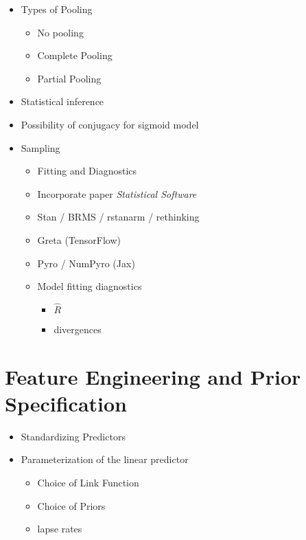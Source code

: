\documentclass[
]{article}
\providecommand{\tightlist}{%
  \setlength{\itemsep}{0pt}\setlength{\parskip}{0pt}}
\begin{document}
\begin{itemize}
\tightlist
\item
  Types of Pooling

  \begin{itemize}
  \tightlist
  \item
    No pooling
  \item
    Complete Pooling
  \item
    Partial Pooling
  \end{itemize}
\item
  Statistical inference
\item
  Possibility of conjugacy for sigmoid model
\item
  Sampling

  \begin{itemize}
  \tightlist
  \item
    Fitting and Diagnostics
  \item
    Incorporate paper \emph{Statistical Software}
  \item
    Stan / BRMS / rstanarm / rethinking
  \item
    Greta (TensorFlow)
  \item
    Pyro / NumPyro (Jax)
  \item
    Model fitting diagnostics

    \begin{itemize}
    \tightlist
    \item
      \(\hat{R}\)
    \item
      divergences
    \end{itemize}
  \end{itemize}
\end{itemize}

\hypertarget{feature-engineering}{%
\section{Feature Engineering and Prior Specification}\label{feature-engineering}}

\begin{itemize}
\tightlist
\item
  Standardizing Predictors
\item
  Parameterization of the linear predictor

  \begin{itemize}
  \tightlist
  \item
    Choice of Link Function
  \item
    Choice of Priors
  \item
    lapse rates
  \end{itemize}
\end{itemize}
\end{document}
